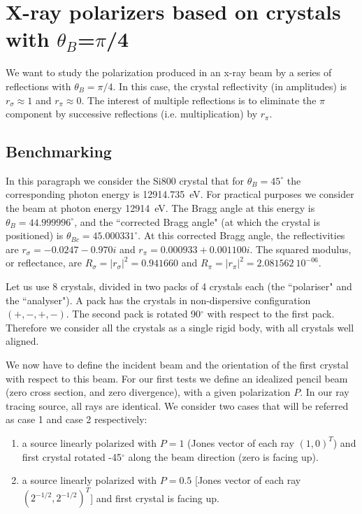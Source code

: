 \documentclass{iucr}
\begin{document}
\section{X-ray polarizers based on crystals with $\theta_B$=$\pi$/4}\label{sec:polarizers45degBenchmark}

We want to study the polarization produced in an x-ray beam by a series of reflections with $\theta_B=\pi/4$. In this case, the crystal reflectivity (in amplitudes) is $r_\sigma \approx 1$ and $r_\pi \approx 0$. The interest of multiple reflections is to eliminate the $\pi$ component by successive reflections (i.e. multiplication) by $r_\pi$.

\subsection{Benchmarking}

In this paragraph we consider the Si800 crystal that for $\theta_B=45^{\circ}$ the corresponding photon energy is 12914.735~eV. For practical purposes we consider the beam at photon energy 12914~eV. The Bragg angle at this energy is $\theta_B=44.999996^{\circ}$, and the ``corrected Bragg angle" (at which the crystal is positioned) is $\theta_{Bc}=45.000331^{\circ}$.
At this corrected Bragg angle, the reflectivities are $r_\sigma=-0.0247-0.970 i$ and $r_\pi=0.000933+0.001100 i$.
The squared modulus, or reflectance, are $R_\sigma=|r_\sigma|^2=0.941660$ and 
$R_\pi=|r_\pi|^2=2.081562~10^{-06}$.

Let us use 8 crystals, divided in two packs of 4 crystals each (the ``polariser" and the ``analyser"). A pack has the crystals in non-dispersive configuration $(+,-,+,-)$. The second pack is rotated 90$^\circ$ with respect to the first pack. Therefore we consider all the crystals as a single rigid body, with all crystals well aligned.

We now have to define the incident beam and the orientation of the first crystal with respect to this beam. For our first tests we define an idealized pencil beam (zero cross section, and zero divergence), with a given polarization $P$. In our ray tracing source, all rays are identical. We consider two cases that will be referred as case 1 and case 2 respectively:
\begin{enumerate}
    \item a source linearly polarized with $P=1$ (Jones vector of each ray $(1,0)^T$) and first crystal rotated -45$^\circ$ along the beam direction (zero is facing up).
    \item a source linearly polarized with $P=0.5$ [Jones vector of each ray $(2^{-1/2},2^{-1/2})^T$] and first crystal is facing up.    
\end{enumerate}
\end{document}
